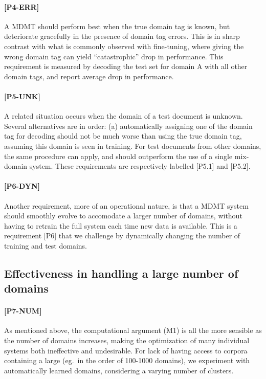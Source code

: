 \documentclass[11pt]{article}
\newcommand{\fyTodo}[1]{\Todo[FY:]{\textcolor{orange}{#1}}}
\begin{document}
\paragraph{[P4-ERR]}
A MDMT should perform best when the true domain tag is known, but deteriorate gracefully in the presence of domain tag errors. This is in sharp contrast with what is commonly observed with fine-tuning, where giving the wrong domain tag can yield ``catastrophic'' drop in performance. This requirement is measured by decoding the test set for domain A with all other domain tags, and report average drop in performance.

\paragraph{[P5-UNK]}
A related situation occurs when the domain of a test document is unknown. Several alternatives are in order: (a) automatically assigning one of the domain tag for decoding should not be much worse than using the true domain tag, assuming this domain is seen in training. For test documents from other domains, the same procedure can apply, and should outperform the use of a single mix-domain system. \fyTodo{Systems react to unknown domains}These requirements are respectively labelled [P5.1] and [P5.2]\fyTodo{Not so sure of these ones}.

\paragraph{[P6-DYN]}
Another requirement, more of an operational nature, is that a MDMT system should smoothly evolve to accomodate a larger number of domains, without having to retrain the full system each time new data is available. This is a requirement [P6] that we challenge by dynamically changing the number of training and test domains.

\subsection{Effectiveness in handling a large number of domains \label{ssec:scaling}}

\paragraph{[P7-NUM]} As mentioned above, the computational argument (M1) is all the more sensible as the number of domains increases, making the optimization of many individual systems both ineffective and undesirable. For lack of having access to corpora containing a large (eg.\ in the order of 100-1000 domains), we experiment with automatically learned domains, considering a varying number of clusters.
\end{document}
